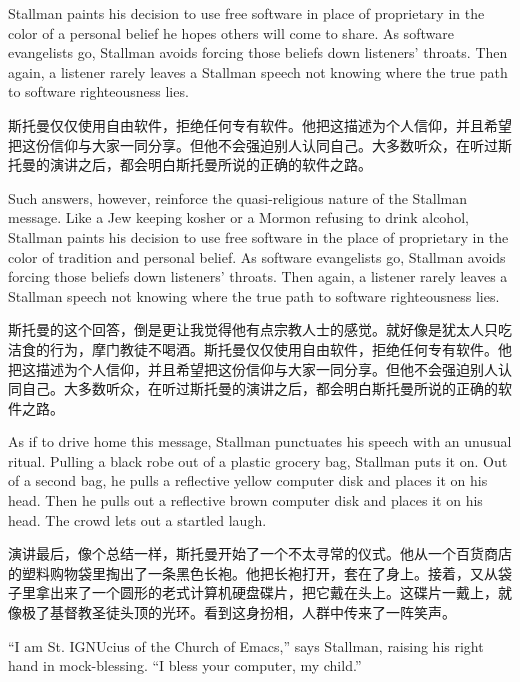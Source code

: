 \ifdefined\eng
Stallman paints his decision to use free software in place of proprietary in the color of a personal belief he hopes others will come to share. As software evangelists go, Stallman avoids forcing those beliefs down listeners' throats. Then again, a listener rarely leaves a Stallman speech not knowing where the true path to software righteousness lies.
\fi

\ifdefined\chs
斯托曼仅仅使用自由软件，拒绝任何专有软件。他把这描述为个人信仰，并且希望把这份信仰与大家一同分享。但他不会强迫别人认同自己。大多数听众，在听过斯托曼的演讲之后，都会明白斯托曼所说的正确的软件之路。
\fi

\fi

\ifdefined\vone

\ifdefined\eng
Such answers, however, reinforce the quasi-religious nature of the Stallman message. Like a Jew keeping kosher or a Mormon refusing to drink alcohol, Stallman paints his decision to use free software in the place of proprietary in the color of tradition and personal belief. As software evangelists go, Stallman avoids forcing those beliefs down listeners' throats. Then again, a listener rarely leaves a Stallman speech not knowing where the true path to software righteousness lies. 
\fi

\ifdefined\chs
斯托曼的这个回答，倒是更让我觉得他有点宗教人士的感觉。就好像是犹太人只吃洁食的行为，摩门教徒不喝酒。斯托曼仅仅使用自由软件，拒绝任何专有软件。他把这描述为个人信仰，并且希望把这份信仰与大家一同分享。但他不会强迫别人认同自己。大多数听众，在听过斯托曼的演讲之后，都会明白斯托曼所说的正确的软件之路。
\fi

\fi

\ifdefined\eng
As if to drive home this message, Stallman punctuates his speech with an unusual ritual. Pulling a black robe out of a plastic grocery bag, Stallman puts it on.  
\ifdefined\vone
Out of a second bag, he pulls a reflective yellow computer disk and places it on his head. 
\fi
\ifdefined\vtwo
Then he pulls out a reflective brown computer disk and places it on his head. 
\fi
The crowd lets out a startled laugh.
\fi

\ifdefined\chs
演讲最后，像个总结一样，斯托曼开始了一个不太寻常的仪式。他从一个百货商店的塑料购物袋里掏出了一条黑色长袍。他把长袍打开，套在了身上。接着，又从袋子里拿出来了一个圆形的老式计算机硬盘碟片，把它戴在头上。这碟片一戴上，就像极了基督教圣徒头顶的光环。看到这身扮相，人群中传来了一阵笑声。
\fi

\ifdefined\eng
``I am St. IGNUcius of the Church of Emacs,'' says Stallman, raising his right hand in mock-blessing. ``I bless your computer, my child.''
\fi

